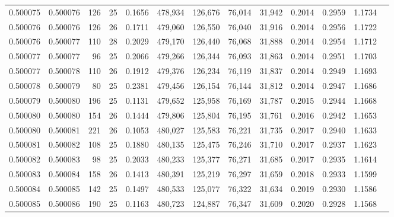 \begin{tabular}{rrrrrrrrrrrrr}
0.500075 & 0.500076 & 126 &  25 &                                     0.1656 & 478,934 & 126,676 &  76,014 &  31,942 & 0.2014 & 0.2959 & 1.1734 \\
0.500076 & 0.500076 & 126 &  26 &                                     0.1711 & 479,060 & 126,550 &  76,040 &  31,916 & 0.2014 & 0.2956 & 1.1722 \\
0.500076 & 0.500077 & 110 &  28 &                                     0.2029 & 479,170 & 126,440 &  76,068 &  31,888 & 0.2014 & 0.2954 & 1.1712 \\
0.500077 & 0.500077 &  96 &  25 &                                     0.2066 & 479,266 & 126,344 &  76,093 &  31,863 & 0.2014 & 0.2951 & 1.1703 \\
0.500077 & 0.500078 & 110 &  26 &                                     0.1912 & 479,376 & 126,234 &  76,119 &  31,837 & 0.2014 & 0.2949 & 1.1693 \\
0.500078 & 0.500079 &  80 &  25 &                                     0.2381 & 479,456 & 126,154 &  76,144 &  31,812 & 0.2014 & 0.2947 & 1.1686 \\
0.500079 & 0.500080 & 196 &  25 &                                     0.1131 & 479,652 & 125,958 &  76,169 &  31,787 & 0.2015 & 0.2944 & 1.1668 \\
0.500080 & 0.500080 & 154 &  26 &                                     0.1444 & 479,806 & 125,804 &  76,195 &  31,761 & 0.2016 & 0.2942 & 1.1653 \\
0.500080 & 0.500081 & 221 &  26 &                                     0.1053 & 480,027 & 125,583 &  76,221 &  31,735 & 0.2017 & 0.2940 & 1.1633 \\
0.500081 & 0.500082 & 108 &  25 &                                     0.1880 & 480,135 & 125,475 &  76,246 &  31,710 & 0.2017 & 0.2937 & 1.1623 \\
0.500082 & 0.500083 &  98 &  25 &                                     0.2033 & 480,233 & 125,377 &  76,271 &  31,685 & 0.2017 & 0.2935 & 1.1614 \\
0.500083 & 0.500084 & 158 &  26 &                                     0.1413 & 480,391 & 125,219 &  76,297 &  31,659 & 0.2018 & 0.2933 & 1.1599 \\
0.500084 & 0.500085 & 142 &  25 &                                     0.1497 & 480,533 & 125,077 &  76,322 &  31,634 & 0.2019 & 0.2930 & 1.1586 \\
0.500085 & 0.500086 & 190 &  25 &                                     0.1163 & 480,723 & 124,887 &  76,347 &  31,609 & 0.2020 & 0.2928 & 1.1568 \\

\end{tabular}
